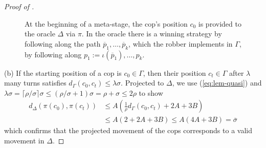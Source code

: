 \documentclass[10pt,a4paper]{amsart}
\renewcommand{\leq}{\leqslant}
\begin{document}
\begin{proof}[Proof of ]
\begin{figure}
  \centering
  \caption{At the beginning of a meta-stage, the cop's position $c_0$ is provided to the oracle $\Delta$ via $\pi$. In the oracle there is a winning strategy by following along the path $\overline{p}_1, \ldots , \overline{p}_k$, which the robber implements in $\Gamma$, by following along $p_1 := \iota(\overline{p}_1), \ldots , p_k$. }
  \label{fig:meta_game}
\end{figure}
(b) If the starting position of a cop is $c_0\in \Gamma$, then their position $c_t \in \Gamma$ after $\lambda$ many turns satisfies $d_{\Gamma}(c_0,c_t) \leq \lambda \sigma $. Projected to $\Delta$, we use (\ref{eq:lem-quasi}) and $\lambda \sigma = \lceil \rho/\sigma \rceil \sigma \leq (\rho/\sigma + 1) \sigma = \rho + \sigma \leq 2\rho$ to show
\begin{align*}
    d_\Delta(\pi(c_0), \pi(c_t))
    & \leq A \left( \frac{1}{\rho} d_{\Gamma}(c_0,c_t) + 2A + 3B\right)
    \\
    &\leq A \left( 2 + 2A +3B \right) \leq A(4A +3B) = \overline{\sigma}
\end{align*}
which confirms that the projected movement of the cops corresponds to a valid movement in $\Delta$.




\end{proof}
\end{document}
